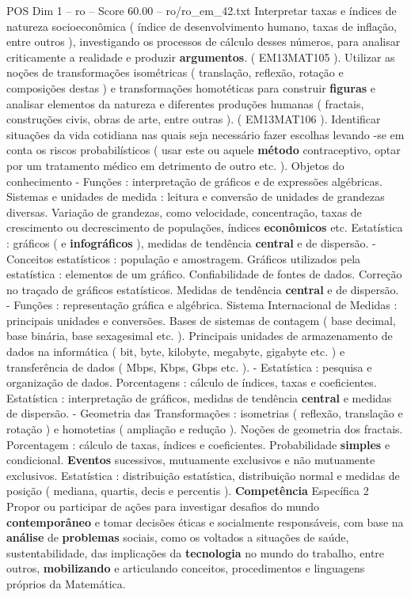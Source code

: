 \begin{textsample}{POS Dim 1 – ro – Score 60.00 – ro/ro\_em\_42.txt}
Interpretar taxas e índices de natureza socioeconômica ( índice de desenvolvimento humano, taxas de inflação, entre outros ), investigando os processos de cálculo desses números, para analisar criticamente a realidade e produzir \textbf{argumentos}. ( EM13MAT105 ).
Utilizar as noções de transformações isométricas ( translação, reflexão, rotação e composições destas ) e transformações homotéticas para construir \textbf{figuras} e analisar elementos da natureza e diferentes produções humanas ( fractais, construções civis, obras de arte, entre outras ). ( EM13MAT106 ).
Identificar situações da vida cotidiana nas quais seja necessário fazer escolhas levando -se em conta os riscos probabilísticos ( usar este ou aquele \textbf{método} contraceptivo, optar por um tratamento médico em detrimento de outro etc. ).
Objetos do conhecimento - Funções : interpretação de gráficos e de expressões algébricas.
Sistemas e unidades de medida : leitura e conversão de unidades de grandezas diversas.
Variação de grandezas, como velocidade, concentração, taxas de crescimento ou decrescimento de populações, índices \textbf{econômicos} etc.
Estatística : gráficos ( e \textbf{infográficos} ), medidas de tendência \textbf{central} e de dispersão. - Conceitos estatísticos : população e amostragem.
Gráficos utilizados pela estatística : elementos de um gráfico.
Confiabilidade de fontes de dados.
Correção no traçado de gráficos estatísticos.
Medidas de tendência \textbf{central} e de dispersão. - Funções : representação gráfica e algébrica.
Sistema Internacional de Medidas : principais unidades e conversões.
Bases de sistemas de contagem ( base decimal, base binária, base sexagesimal etc. ).
Principais unidades de armazenamento de dados na informática ( bit, byte, kilobyte, megabyte, gigabyte etc. ) e transferência de dados ( Mbps, Kbps, Gbps etc. ). - Estatística : pesquisa e organização de dados.
Porcentagens : cálculo de índices, taxas e coeficientes.
Estatística : interpretação de gráficos, medidas de tendência \textbf{central} e medidas de dispersão. - Geometria das Transformações : isometrias ( reflexão, translação e rotação ) e homotetias ( ampliação e redução ).
Noções de geometria dos fractais.
Porcentagem : cálculo de taxas, índices e coeficientes.
Probabilidade \textbf{simples} e condicional. \textbf{Eventos} sucessivos, mutuamente exclusivos e não mutuamente exclusivos.
Estatística : distribuição estatística, distribuição normal e medidas de posição ( mediana, quartis, decis e percentis ). \textbf{Competência} Específica 2 Propor ou participar de ações para investigar desafios do mundo \textbf{contemporâneo} e tomar decisões éticas e socialmente responsáveis, com base na \textbf{análise} de \textbf{problemas} sociais, como os voltados a situações de saúde, sustentabilidade, das implicações da \textbf{tecnologia} no mundo do trabalho, entre outros, \textbf{mobilizando} e articulando conceitos, procedimentos e linguagens próprios da Matemática.

\end{textsample}

